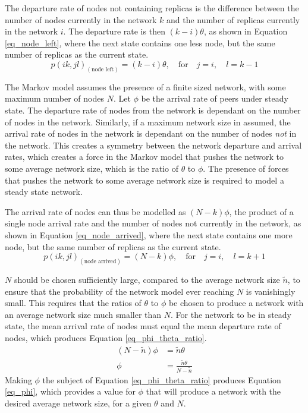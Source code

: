 \documentclass[10pt,a4paper,conference]{IEEEtran}
\begin{document}
The departure rate of nodes not containing replicas is the difference between the number of nodes currently in the network $k$ and the number of replicas currently in the network $i$. The departure rate is then $(k - i)\theta$, as shown in Equation \eqref{eq_node_left}, where the next state contains one less node, but the same number of replicas as the current state.
%
\begin{equation} \label{eq_node_left}
    p(i k,j l)_{(\textrm{node left})} = (k - i)\theta,\quad\textrm{for}\quad j = i,\quad l = k - 1
\end{equation}

The Markov model assumes the presence of a finite sized network, with some maximum number of nodes $N$. Let $\phi$ be the arrival rate of peers under steady state. The departure rate of nodes from the network is dependant on the number of nodes in the network. Similarly, if a maximum network size in assumed, the arrival rate of nodes in the network is dependant on the number of nodes \emph{not} in the network. This creates a symmetry between the network departure and arrival rates, which creates a force in the Markov model that pushes the network to some average network size, which is the ratio of $\theta$ to $\phi$. The presence of forces that pushes the network to some average network size is required to model a steady state network.

The arrival rate of nodes can thus be modelled as $(N - k)\phi$, the product of a single node arrival rate and the number of nodes not currently in the network, as shown in Equation \eqref{eq_node_arrived}, where the next state contains one more node, but the same number of replicas as the current state.
%
\begin{equation} \label{eq_node_arrived}
    p(i k,j l)_{(\textrm{node arrived})} = (N - k)\phi,\quad\textrm{for}\quad j = i,\quad l = k + 1
\end{equation}


$N$ should be chosen sufficiently large, compared to the average network size $\tilde{n}$, to ensure that the probability of the network model ever reaching $N$ is vanishingly small. This requires that the ratios of $\theta$ to $\phi$ be chosen to produce a network with an average network size much smaller than $N$. For the network to be in steady state, the mean arrival rate of nodes must equal the mean departure rate of nodes, which produces Equation \eqref{eq_phi_theta_ratio}.
%
\begin{align}
    (N - \tilde{n})\phi &= \tilde{n}\theta\label{eq_phi_theta_ratio}\\
    \phi &= \frac{\tilde{n}\theta}{N - \tilde{n}}\label{eq_phi}
\end{align}
%
Making $\phi$ the subject of Equation \eqref{eq_phi_theta_ratio} produces Equation \eqref{eq_phi}, which provides a value for $\phi$ that will produce a network with the desired average network size, for a given $\theta$ and $N$.
\end{document}

